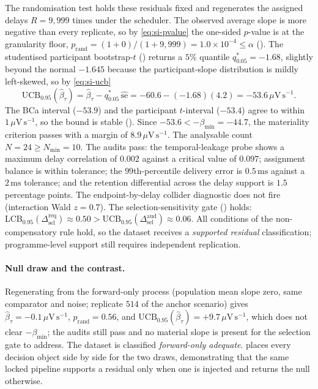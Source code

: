 \documentclass[11pt,a4paper]{article}
\theoremstyle{definition}
\newcommand{\UCB}{\mathrm{UCB}_{0.95}}
\newcommand{\LCB}{\mathrm{LCB}_{0.95}}
\begin{document}
The randomisation test holds these residuals fixed and regenerates the assigned
delays \(R=9{,}999\) times under the scheduler. The observed average slope is more
negative than every replicate, so by \eqref{eq:si-pvalue} the one-sided
\(p\)-value is at the granularity floor,
\(p_{\mathrm{rand}}=(1+0)/(1+9{,}999)=1.0\times10^{-4}\le\alpha\)
(). The studentised participant bootstrap-\(t\)
() returns a \(5\%\) quantile
\(q^{*}_{0.05}=-1.68\), slightly beyond the normal \(-1.645\) because the
participant-slope distribution is mildly left-skewed, so by \eqref{eq:si-ucb}
\begin{equation*}
\UCB(\widehat{\beta}_\tau)
=\widehat{\beta}_\tau-q^{*}_{0.05}\,\widehat{\mathrm{se}}
=-60.6-(-1.68)(4.2)
=-53.6\,\mu\mathrm{V\,s^{-1}}.
\end{equation*}
The BCa interval (\(-53.9\)) and the participant \(t\)-interval (\(-53.4\)) agree
to within \(1\,\mu\mathrm{V\,s^{-1}}\), so the bound is stable
(). Since \(-53.6<-\beta_{\min}=-44.7\), the
materiality criterion passes with a margin of \(8.9\,\mu\mathrm{V\,s^{-1}}\). The
analysable count \(N=24\ge N_{\min}=10\). The audits pass: the temporal-leakage
probe shows a maximum delay correlation of \(0.002\) against a critical value of
\(0.097\); assignment balance is within tolerance; the \(99\)th-percentile delivery
error is \(0.5\,\mathrm{ms}\) against a \(2\,\mathrm{ms}\) tolerance; and the
retention differential across the delay support is \(1.5\) percentage points. The
endpoint-by-delay collider diagnostic does not fire (interaction Wald
\(z=0.7\)). The selection-sensitivity gate
() holds:
\(\LCB(\Delta_{\mathrm{sel}}^{\mathrm{req}})\approx0.50>
\UCB(\Delta_{\mathrm{sel}}^{\mathrm{aud}})\approx0.06\). All conditions of the
non-compensatory rule hold, so the dataset receives a \textit{supported
residual} classification; programme-level support still requires independent
replication.

\paragraph{Null draw and the contrast.} Regenerating from the forward-only process
(population mean slope zero, same comparator and noise; replicate \(514\) of the
anchor scenario) gives \(\widehat{\beta}_\tau=-0.1\,\mu\mathrm{V\,s^{-1}}\),
\(p_{\mathrm{rand}}=0.56\), and \(\UCB(\widehat{\beta}_\tau)=+9.7\,
\mu\mathrm{V\,s^{-1}}\), which does not clear \(-\beta_{\min}\); the audits still
pass and no material slope is present for the selection gate to address. The
dataset is classified \textit{forward-only adequate}.
 places every decision object side by side for the
two draws, demonstrating that the same locked pipeline supports a residual only
when one is injected and returns the null otherwise.
\end{document}
